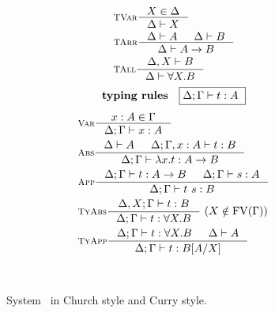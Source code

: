 \begin{figure}
\begin{singlespace}
\begin{minipage}{.46\textwidth}
\begin{align*}
& \inference[\sc TVar]{X \in \Delta}{\Delta |- X} \\
& \inference[\sc TArr]{\Delta |- A & \Delta |- B}{\Delta |- A -> B} \\
& \inference[\sc TAll]{\Delta,X |- B}{\Delta |- \forall X.B} \\
\end{align*}
\[ \textbf{typing rules} \quad \framebox{$ \Delta;\Gamma |- t : A $ } \]
\vspace*{-1em}
\begin{align*}
& \inference[\sc Var]{x:A \in \Gamma}{\Delta;\Gamma |- x:A} \\
& \inference[\sc Abs]{\Delta |- A & \Delta;\Gamma,x:A |- t : B}
                     {\Delta;\Gamma |- \l x   .t : A -> B} \\
& \inference[\sc App]{\Delta;\Gamma |- t : A -> B & \Delta;\Gamma |- s : A}
                     {\Delta;\Gamma |- t~s : B} \\
& \inference[\sc TyAbs]{\Delta,X;\Gamma |- t : B}
                       {\Delta;\Gamma |- t : \forall X.B} ~
                       (X\notin\FV(\Gamma)) \\
& \inference[\sc TyApp]{\Delta;\Gamma |- t : \forall X.B & \Delta |- A}
                       {\Delta;\Gamma |- t : B[A/X]}
\end{align*}
\end{minipage}
~\\
\caption{System \F\ in Church style and Curry style.}
\label{fig:f}
\end{singlespace}
\end{figure}

